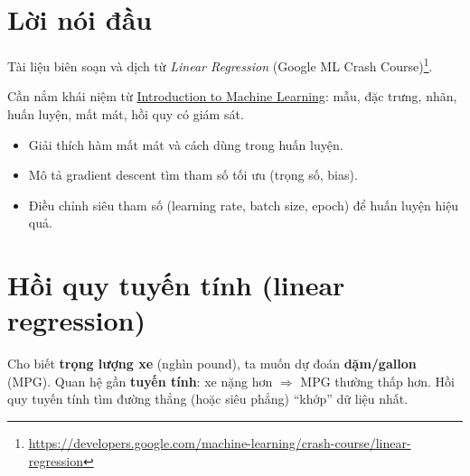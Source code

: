 \documentclass[12pt,a4paper]{article}
\begin{document}

\newpage
\tableofcontents
\newpage

\section*{Lời nói đầu}

\begin{ynghia}[title={Nguồn và cách đọc}]
Tài liệu biên soạn và dịch từ \emph{Linear Regression} (Google ML Crash Course)\footnote{\url{https://developers.google.com/machine-learning/crash-course/linear-regression}}.
\end{ynghia}

\begin{luuy}[title={Điều kiện tiên quyết}]
Cần nắm khái niệm từ \href{https://developers.google.com/machine-learning/intro-to-ml}{Introduction to Machine Learning}: mẫu, đặc trưng, nhãn, huấn luyện, mất mát, hồi quy có giám sát.
\end{luuy}

\begin{phuongphap}[title={target học tập}]
\begin{itemize}
  \item Giải thích hàm mất mát và cách dùng trong huấn luyện.
  \item Mô tả gradient descent tìm tham số tối ưu (trọng số, bias).
  \item Điều chỉnh siêu tham số (learning rate, batch size, epoch) để huấn luyện hiệu quả.
\end{itemize}
\end{phuongphap}

\newpage

\section{Hồi quy tuyến tính (linear regression)}

\begin{dongco}[title={Dự đoán mức tiêu thụ nhiên liệu}]
Cho biết \textbf{trọng lượng xe} (nghìn pound), ta muốn dự đoán \textbf{dặm/gallon} (MPG). Quan hệ gần \textbf{tuyến tính}: xe nặng hơn $\Rightarrow$ MPG thường thấp hơn. Hồi quy tuyến tính tìm đường thẳng (hoặc siêu phẳng) ``khớp'' dữ liệu nhất.
\end{dongco}
\end{document}
